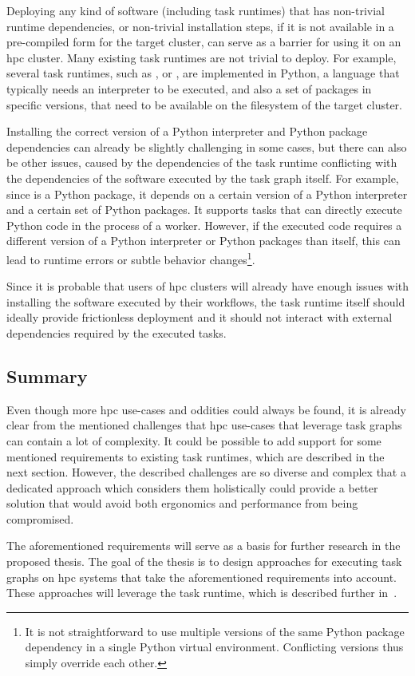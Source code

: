 Deploying any kind of software (including task runtimes) that has non-trivial runtime dependencies,
or non-trivial installation steps, if it is not available in a pre-compiled form for the target
cluster, can serve as a barrier for using it on an \gls{hpc} cluster. Many
existing task runtimes are not trivial to deploy. For example, several task runtimes, such as \dask{},
\snakemake{} or \pycompss{}, are implemented in Python, a language
that typically needs an interpreter to be executed, and also a set of packages in specific
versions, that need to be available on the filesystem of the target cluster.

Installing the correct version of a Python interpreter and Python package dependencies can already
be slightly challenging in some cases, but there can also be other issues, caused by the
dependencies of the task runtime conflicting with the dependencies of the software executed by the
task graph itself. For example, since \dask{} is a Python package, it depends
on a certain version of a Python interpreter and a certain set of Python packages. It supports
tasks that can directly execute Python code in the process of a \dask{} worker.
However, if the executed code requires a different version of a Python interpreter or Python
packages than \dask{} itself, this can lead to runtime errors or subtle
behavior changes\footnote{It is not straightforward to use multiple versions of the same Python package dependency in a
single Python virtual environment. Conflicting versions thus simply override each other.}.

Since it is probable that users of \gls{hpc} clusters will already have enough
issues with installing the software executed by their workflows, the task runtime itself should
ideally provide frictionless deployment and it should not interact with external dependencies
required by the executed tasks.

\subsection{Summary}
Even though more \gls{hpc} use-cases and oddities could always be found, it is
already clear from the mentioned challenges that \gls{hpc} use-cases that
leverage task graphs can contain a lot of complexity. It could be possible to add support for some
mentioned requirements to existing task runtimes, which are described in the next section. However,
the described challenges are so diverse and complex that a dedicated approach which considers them
holistically could provide a better solution that would avoid both ergonomics and performance from
being compromised.

The aforementioned requirements will serve as a basis for further research in the proposed thesis.
The goal of the thesis is to design approaches for executing task graphs on
\gls{hpc} systems that take the aforementioned requirements into account. These
approaches will leverage the \hyperqueue{} task runtime, which is described further
in~.
